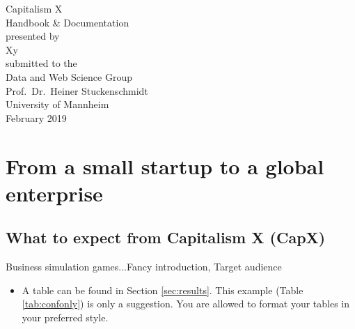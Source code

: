 \documentclass[11pt,titlepage,oneside,openany]{book}
\begin{document}
\begin{titlepage}
	\vspace*{2cm}
  \begin{center}
   {\Large Capitalism X\\}
   \vspace{2cm} 
   {Handbook \& Documentation\\}
   \vspace{2cm}
   {presented by\\
    Xy \\
   }
   \vspace{1cm} 
   {submitted to the\\
    Data and Web Science Group\\
    Prof.\ Dr.\ Heiner Stuckenschmidt\\
    University of Mannheim\\} \vspace{2cm}
   {February 2019}
  \end{center}
\end{titlepage} 

\tableofcontents
\newpage

\listoffigures

\listoftables


\newpage
\chapter{From a small startup to a global enterprise}
\label{cha:intro}
\section{What to expect from Capitalism X (CapX)}

Business simulation games...Fancy introduction, Target audience

\begin{itemize}
	\item A table can be found in Section \ref{sec:results}. This example (Table \ref{tab:confonly}) is only a suggestion. You are allowed to format your tables in your preferred style.
\end{itemize}
\end{document}
